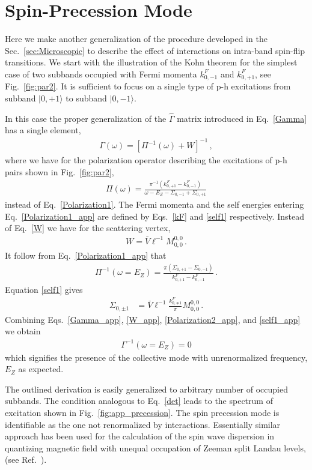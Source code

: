 \section{Spin-Precession Mode}
\label{sec:app_precession}
%
Here we make another generalization of the procedure developed in the Sec.~\ref{sec:Microscopic} to describe the effect of interactions on intra-band spin-flip transitions.
We start with the illustration of the Kohn theorem for the simplest case of two subbands occupied with Fermi momenta $k^F_{0,-1}$ and $k^F_{0,+1}$, see Fig.~\ref{fig:par2}. 
It is sufficient to focus on a single type of p-h excitations from subband $|0,+1 \rangle$ to subband $|0,-1 \rangle$.



In this case the proper generalization of the $\hat{\Gamma}$ matrix introduced in Eq.~\eqref{Gamma} has a single element,
\begin{align}\label{Gamma_app}
\Gamma(\omega) =\left[ \Pi^{-1}(\omega) + W \right]^{-1}\, ,
\end{align}
where we have for the polarization operator describing the excitations of p-h pairs shown in Fig.~\ref{fig:par2}, 
\begin{align}\label{Polarization1_app}
\Pi(\omega)= 
\frac{\pi^{-1} \left( k^F_{0,+1} - k^F_{0,-1}\right) }{
\omega  - E_Z
-
\Sigma_{0,-1} + \Sigma_{0,+1}
}
\end{align}
instead of Eq.~\eqref{Polarization1}.
The Fermi momenta and the self energies entering Eq.~\eqref{Polarization1_app} are defined by Eqs.~\eqref{kF} and \eqref{self1} respectively.
Instead of Eq.~\eqref{W} we have for the scattering vertex,
\begin{align}\label{W_app}
W =\bar{V} \ell^{-1} M^{0,0}_{0,0} \, .
\end{align}
It follow from Eq.~\eqref{Polarization1_app} that
\begin{align}\label{Polarization2_app}
\Pi^{-1}(\omega=E_Z)= 
\frac{\pi (\Sigma_{0,+1}-\Sigma_{0,-1})}{  k^F_{0,+1} - k^F_{0,-1}}\, .
\end{align}
Equation \eqref{self1} gives
\begin{align}\label{self1_app}
\Sigma_{0,\pm 1} & =
\bar{V} \ell^{-1}  \frac{k^F_{0,\mp 1}}{ \pi } M^{0,0}_{0,0}\, .
\end{align}
Combining Eqs.~\eqref{Gamma_app}, \eqref{W_app}, \eqref{Polarization2_app}, and \eqref{self1_app} we obtain
\begin{align}
\Gamma^{-1}(\omega = E_Z) = 0
\end{align}
which signifies the presence of the collective mode with unrenormalized frequency, $E_Z$ as expected.





The outlined derivation is easily generalized to arbitrary number of occupied subbands.
The condition analogous to Eq.~\eqref{det} leads to the spectrum of excitation shown in Fig.~\ref{fig:app_precession}.
The spin precession mode is identifiable as the one not renormalized by interactions.
Essentially similar approach has been used for the calculation of the spin wave dispersion in quantizing magnetic field with unequal occupation of Zeeman split Landau levels, (see Ref.~\cite{Kallin1984}).

